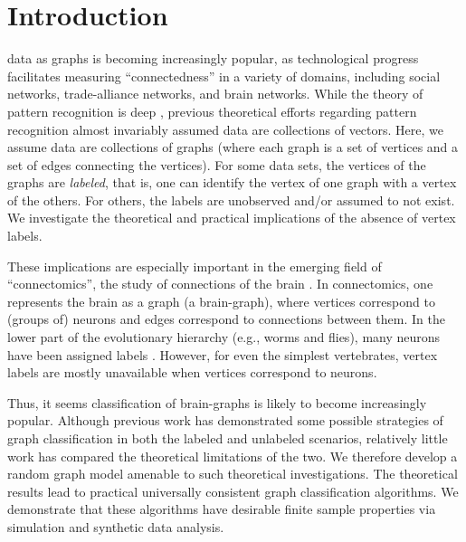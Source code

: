 \documentclass[10pt,journal,cspaper,compsoc]{IEEEtran}
\begin{document}
\maketitle
\IEEEdisplaynotcompsoctitleabstractindextext
\IEEEpeerreviewmaketitle



\section{Introduction} \label{sec:1}

 data as graphs is becoming increasingly popular, as technological progress facilitates measuring ``connectedness'' in a variety of domains, including social networks, trade-alliance networks, and brain networks.  While the theory of pattern recognition is deep \cite{Devroye1996}, previous theoretical efforts regarding pattern recognition almost invariably assumed data are collections of vectors.  Here, we assume data are collections of graphs (where each graph is a set of vertices and a set of edges connecting the vertices).  For some data sets, the vertices of the graphs are \emph{labeled}, that is, one can identify the vertex of one graph with a vertex of the others.  For others, the labels are unobserved and/or assumed to not exist.  We investigate the theoretical and practical implications of the absence of vertex labels.  

These implications are especially important in the emerging field of ``connectomics'', the study of connections of the brain \cite{Hagmann05, Sporns2010}.  In connectomics, one represents the brain as a graph (a brain-graph), where vertices correspond to (groups of) neurons and edges correspond to connections between them.  In the lower part of the evolutionary hierarchy (e.g., worms and flies), many neurons have been assigned labels \cite{WhiteBrenner86}.  However, for even the simplest vertebrates, vertex labels are mostly unavailable when vertices correspond to neurons.  

Thus, it seems classification of brain-graphs is likely to become increasingly popular.  Although previous work has demonstrated some possible strategies of graph classification in both the labeled \cite{VP11_sigsub} and unlabeled \cite{Duin2011} scenarios, relatively little work has compared the theoretical limitations of the two.  We therefore develop a random graph model amenable to such theoretical investigations.  The theoretical results lead to practical universally consistent graph classification algorithms.  We demonstrate that these algorithms have desirable finite sample properties via simulation and synthetic data analysis.
\end{document}

